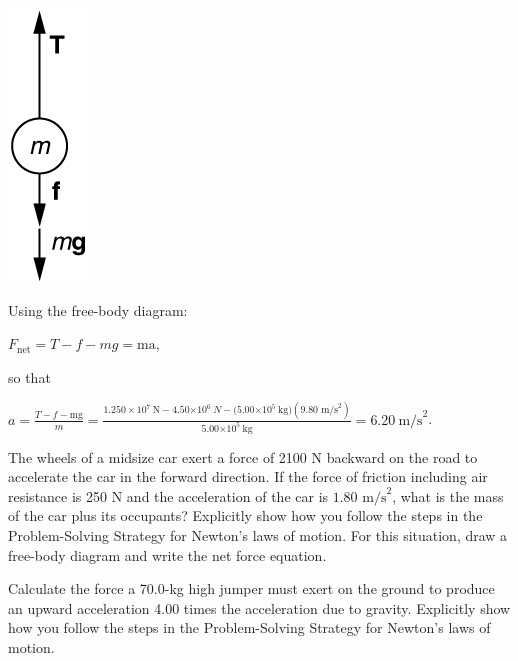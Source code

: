 \documentclass[
]{book}
\begin{document}
\leavevmode{}%
\includegraphics{images/Figure_04_06_02.jpg}

Using the free-body diagram:

\({{F_{\text{net}} = {T - f - mg}} = \text{ma}}{}\),

so that

\({{{{a = \frac{T{-}f{-}\text{mg}}{m}} = \frac{1\text{.}{\text{250} \times \text{10}^{7}\ }{\text{N} - 4.50}{\times \text{10}^{\text{6}}}\ {N - (}5.00{\times \text{10}^{5}\ }\text{kg})(9.\text{80\ m/s}^{2})}{5.00{\times \text{10}^{5}}\ \text{kg}}} = \text{6.20}}\ \text{m/s}^{2}}{}\).

\hypertarget{fs-id2651416}{}
\leavevmode{}%
The wheels of a midsize car exert a force of 2100 N backward on the road
to accelerate the car in the forward direction. If the force of friction
including air resistance is 250 N and the acceleration of the car is
\({1\text{.}\text{80\ m/s}^{2}}{}\), what is the mass of the car plus its
occupants? Explicitly show how you follow the steps in the
Problem-Solving Strategy for Newton's laws of motion. For this
situation, draw a free-body diagram and write the net force equation.

\hypertarget{fs-id1630579}{}
\leavevmode{}%
Calculate the force a 70.0-kg high jumper must exert on the ground to
produce an upward acceleration 4.00 times the acceleration due to
gravity. Explicitly show how you follow the steps in the Problem-Solving
Strategy for Newton's laws of motion.
\end{document}
